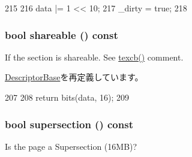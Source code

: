 \begin{DoxyCode}
215         {
216             data |= 1 << 10;
217             _dirty = true;
218         }
\end{DoxyCode}
\hypertarget{classArmISA_1_1TableWalker_1_1L1Descriptor_a9b831498b02d6b485c2b15f33ccd0582}{
\subsubsection[{shareable}]{\setlength{\rightskip}{0pt plus 5cm}bool shareable () const}}
\label{classArmISA_1_1TableWalker_1_1L1Descriptor_a9b831498b02d6b485c2b15f33ccd0582}
If the section is shareable. See \hyperlink{classArmISA_1_1TableWalker_1_1L1Descriptor_a2f3e1adbe4ca1fa91c6c12f35828dd73}{texcb()} comment. 

\hyperlink{classArmISA_1_1TableWalker_1_1DescriptorBase_a2192d5ee6fa7a5fc873e6cdbe8827339}{DescriptorBase}を再定義しています。


\begin{DoxyCode}
207         {
208             return bits(data, 16);
209         }
\end{DoxyCode}
\hypertarget{classArmISA_1_1TableWalker_1_1L1Descriptor_ab5c6c732aec03fe793fb2f885ecebdb5}{
\subsubsection[{supersection}]{\setlength{\rightskip}{0pt plus 5cm}bool supersection () const}}
\label{classArmISA_1_1TableWalker_1_1L1Descriptor_ab5c6c732aec03fe793fb2f885ecebdb5}
Is the page a Supersection (16MB)? 


